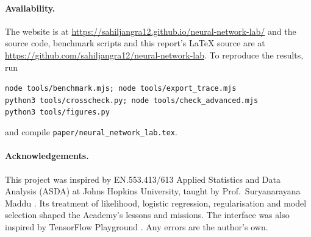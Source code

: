\documentclass[11pt,a4paper]{article}
\newcommand{\code}[1]{\texttt{\small #1}}
\newcommand{\siteurl}{\url{https://sahiljangra12.github.io/neural-network-lab/}}
\newcommand{\courseName}{EN.553.413/613 Applied Statistics and Data Analysis (ASDA)}
\newcommand{\profName}{Prof.\ Suryanarayana Maddu}
\begin{document}
\paragraph{Availability.} The website is at \siteurl{} and the source code, benchmark scripts and this report's \LaTeX{} source are at \url{https://github.com/sahiljangra12/neural-network-lab}. To reproduce the results, run
\begin{center}\small\code{node tools/benchmark.mjs; node tools/export\_trace.mjs}\\\code{python3 tools/crosscheck.py; node tools/check\_advanced.mjs}\\\code{python3 tools/figures.py}\end{center}
and compile \code{paper/neural\_network\_lab.tex}.

\paragraph{Acknowledgements.} This project was inspired by \courseName{} at Johns Hopkins University, taught by \profName{} \citep{asda2026}. Its treatment of likelihood, logistic regression, regularisation and model selection shaped the Academy's lessons and missions. The interface was also inspired by TensorFlow Playground \citep{smilkov2017playground}. Any errors are the author's own.



\end{document}
